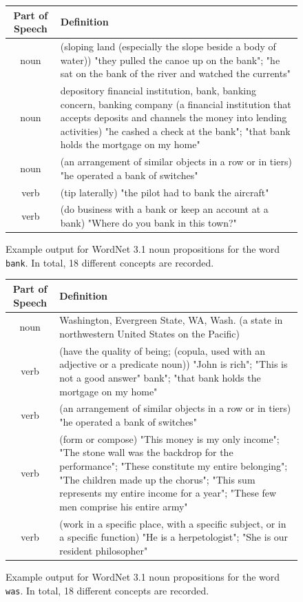 \documentclass[a4paper,12pt,twoside,openright]{report}
\begin{document}
\begin{figure}
\begin{center}
\begin{tabular}{ | c | p{11cm} | } 
 \hline
 Part of Speech & Definition \\  
 \hline
noun     & (sloping land (especially the slope beside a body of water)) "they pulled the canoe up on the bank"; "he sat on the bank of the river and watched the currents"\\ 
noun     & depository financial institution, bank, banking concern, banking company (a financial institution that accepts deposits and channels the money into lending activities) "he cashed a check at the bank"; "that bank holds the mortgage on my home" \\ 
 noun     & (an arrangement of similar objects in a row or in tiers) "he operated a bank of switches"  \\ 
verb & (tip laterally) "the pilot had to bank the aircraft" \\ 
verb    & (do business with a bank or keep an account at a bank) "Where do you bank in this town?"  \\ 
 \hline
\end{tabular}
\end{center}
\caption{Example output for WordNet 3.1 noun propositions for the word \texttt{bank}. In total, 18 different concepts are recorded.}
\label{fig:bank_synset}
\end{figure}

\begin{figure}
\begin{center}
\begin{tabular}{ | c | p{11cm} | } 
 \hline
 Part of Speech & Definition \\ 
 \hline
noun     & Washington, Evergreen State, WA, Wash. (a state in northwestern United States on the Pacific) \\ 
verb     & (have the quality of being; (copula, used with an adjective or a predicate noun)) "John is rich"; "This is not a good answer"
 bank"; "that bank holds the mortgage on my home" \\ 
 verb     & (an arrangement of similar objects in a row or in tiers) "he operated a bank of switches"  \\ 
verb & (form or compose) "This money is my only income"; "The stone wall was the backdrop for the performance"; "These constitute my entire belonging"; "The children made up the chorus"; "This sum represents my entire income for a year"; "These few men comprise his entire army" \\ 
verb    & (work in a specific place, with a specific subject, or in a specific function) "He is a herpetologist"; "She is our resident philosopher"  \\ 
 \hline
\end{tabular}
\end{center}
\caption{Example output for WordNet 3.1 noun propositions for the word \texttt{was}. In total, 18 different concepts are recorded.}
\label{fig:was_synset}
\end{figure}
\end{document}
